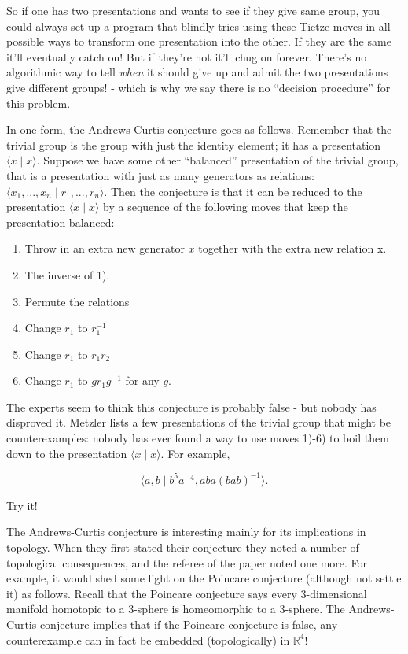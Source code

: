 \documentclass{article}
\def\tightlist{}
\begin{document}
So if one has two presentations and wants to see if they give same
group, you could always set up a program that blindly tries using these
Tietze moves in all possible ways to transform one presentation into the
other. If they are the same it'll eventually catch on! But if they're
not it'll chug on forever. There's no algorithmic way to tell
\emph{when} it should give up and admit the two presentations give
different groups! - which is why we say there is no ``decision
procedure'' for this problem.

In one form, the Andrews-Curtis conjecture goes as follows. Remember
that the trivial group is the group with just the identity element; it
has a presentation \(\langle x \mid x \rangle\). Suppose we have some
other ``balanced'' presentation of the trivial group, that is a
presentation with just as many generators as relations:
\(\langle x_1,...,x_n \mid r_1,...,r_n \rangle\). Then the conjecture is
that it can be reduced to the presentation \(\langle x \mid x \rangle\)
by a sequence of the following moves that keep the presentation
balanced:

\begin{enumerate}
\def\labelenumi{\arabic{enumi})}
\tightlist
\item
  Throw in an extra new generator \(x\) together with the extra new
  relation x.
\item
  The inverse of 1).
\item
  Permute the relations
\item
  Change \(r_1\) to \(r_1^{-1}\)
\item
  Change \(r_1\) to \(r_1r_2\)
\item
  Change \(r_1\) to \(gr_1g^{-1}\) for any \(g\).
\end{enumerate}

The experts seem to think this conjecture is probably false - but nobody
has disproved it. Metzler lists a few presentations of the trivial group
that might be counterexamples: nobody has ever found a way to use moves
1)-6) to boil them down to the presentation
\(\langle x \mid x \rangle\). For example,

\[\langle a, b \mid b^5a^{-4}, aba(bab)^{-1}\rangle.\]

Try it!

The Andrews-Curtis conjecture is interesting mainly for its implications
in topology. When they first stated their conjecture they noted a number
of topological consequences, and the referee of the paper noted one
more. For example, it would shed some light on the Poincare conjecture
(although not settle it) as follows. Recall that the Poincare conjecture
says every 3-dimensional manifold homotopic to a 3-sphere is
homeomorphic to a 3-sphere. The Andrews-Curtis conjecture implies that
if the Poincare conjecture is false, any counterexample can in fact be
embedded (topologically) in \(\mathbb{R}^4\)!
\end{document}
